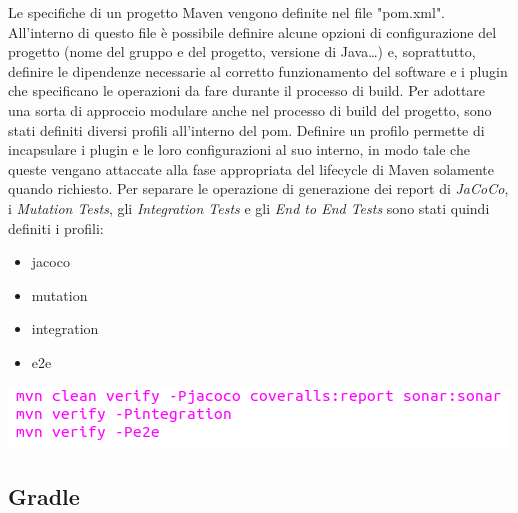 Le specifiche di un progetto Maven vengono definite nel file "pom.xml".\newline
All'interno di questo file è possibile definire alcune opzioni di configurazione del progetto (nome del gruppo e del progetto, versione di Java\dots) e, soprattutto, definire le dipendenze necessarie al corretto funzionamento del software e i plugin che specificano le operazioni da fare durante il processo di build.\newline
Per adottare una sorta di approccio modulare anche nel processo di build del progetto, sono stati definiti diversi profili all'interno del pom.\newline
Definire un profilo permette di incapsulare i plugin e le loro configurazioni al suo interno, in modo tale che queste vengano attaccate alla fase appropriata del lifecycle di Maven solamente quando richiesto.\newline
Per separare le operazione di generazione dei report di \textsl{JaCoCo}, i \textsl{Mutation Tests}, gli \textsl{Integration Tests} e gli \textsl{End to End Tests} sono stati quindi definiti i profili:
\begin{itemize}
	\item jacoco
	\item mutation
	\item integration
	\item e2e
\end{itemize}

\begin{minipage}{\linewidth}
	\includegraphics[width=\textwidth]{img/maven-goals.png}
\end{minipage}
\newline

\subsection{Gradle}

